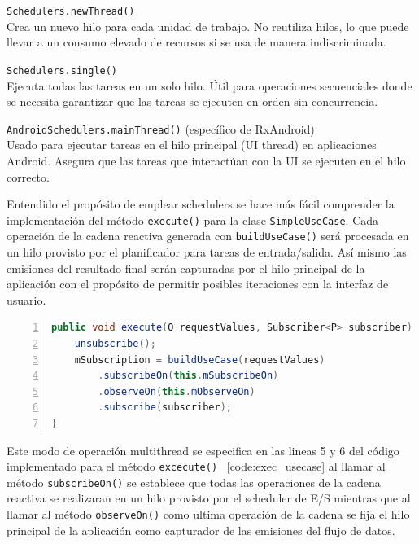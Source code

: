 \texttt{Schedulers.newThread()}\\
Crea un nuevo hilo para cada unidad de trabajo.
No reutiliza hilos, lo que puede llevar a un consumo elevado de recursos si se usa de manera indiscriminada.

\texttt{Schedulers.single()}\\
Ejecuta todas las tareas en un solo hilo.
Útil para operaciones secuenciales donde se necesita garantizar que las tareas se ejecuten en orden sin concurrencia.

\texttt{AndroidSchedulers.mainThread()} (específico de RxAndroid)\\
Usado para ejecutar tareas en el hilo principal (UI thread) en aplicaciones Android.
Asegura que las tareas que interactúan con la UI se ejecuten en el hilo correcto.


Entendido el propósito de emplear schedulers se hace más fácil comprender la implementación del método \texttt{execute()} para la clase \texttt{SimpleUseCase}.
Cada operación de la cadena reactiva generada con \texttt{buildUseCase()} será procesada en un hilo provisto por el planificador para tareas de entrada/salida.
Así mismo las emisiones del resultado final serán capturadas por el hilo principal de la aplicación con el propósito de permitir posibles iteraciones con 
la interfaz de usuario. 

\begin{lstlisting}[caption={Método execute SimpleUseCase}, label={code:exec_usecase}, language=java, basicstyle=\ttfamily \footnotesize, numbers=left, stepnumber=1, showstringspaces=false, float]
public void execute(Q requestValues, Subscriber<P> subscriber) {
	unsubscribe();
	mSubscription = buildUseCase(requestValues)
		.subscribeOn(this.mSubscribeOn)
		.observeOn(this.mObserveOn)
		.subscribe(subscriber);
}
\end{lstlisting}

Este modo de operación multithread se especifica en las lineas 5 y 6 del código implementado para el método \texttt{excecute()} ~\ref{code:exec_usecase}
al llamar al método \texttt{subscribeOn()} se establece que todas las operaciones de la cadena reactiva se realizaran en un hilo provisto por el scheduler de E/S mientras que al llamar al método \texttt{observeOn()} como ultima operación de la cadena se fija el hilo principal de la aplicación como capturador de las emisiones del flujo de datos.

